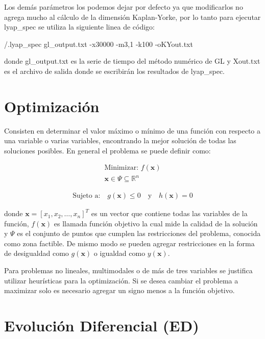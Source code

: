 \documentclass[10pt,a4paper]{article}
\begin{document}
Los demás parámetros los podemos dejar por defecto ya que modificarlos no agrega mucho al cálculo de la dimensión Kaplan-Yorke, por lo tanto para ejecutar lyap\_{}spec se utiliza la siguiente linea de código:

\begin{center}
/.lyap\_{}spec gl\_{}output.txt -x30000 -m3,1 -k100 -oKYout.txt
\end{center}
donde gl\_{}output.txt es la serie de tiempo del método numérico de GL y Xout.txt es el archivo de salida donde se escribirán los resultados de lyap\_{}spec.




\section{Optimización}

Consisten en determinar el valor máximo o mínimo de una función con respecto a una variable o varias variables, encontrando la mejor solución de todas las soluciones posibles. En general el problema se puede definir como:


\[
	\begin{array}{c}
		\text{Minimizar:} \,\, f(\mathbf{x}) \\
		\mathbf{x} \in \Psi \subseteq \mathbb{R}^{n}
	\end{array}
\]

\[
	\begin{array}{c}
		\text{Sujeto a:}  \quad g(\mathbf{x}) \leq 0 \quad \text{y} \quad h(\mathbf{x}) = 0
	\end{array}
\]


		
donde $\mathbf{x} = [x_{1}, x_{2}, \ldots , x_{n}]^{T}$ es un vector que contiene todas las variables de la función, $f(\mathbf{x})$ es llamada función objetivo la cual mide la calidad de la solución y $\Psi$ es el conjunto de puntos que cumplen las restricciones del problema, conocida como zona factible. De mismo modo se pueden agregar restricciones en la forma de desigualdad como $g(\mathbf{x})$ o igualdad como $y(\mathbf{x})$.

Para problemas no lineales, multimodales o de más de tres variables se justifica utilizar heurísticas para la optimización. Si se desea cambiar el problema a maximizar solo es necesario agregar un signo menos a la función objetivo. 


\section{Evolución Diferencial (ED)}
\end{document}
